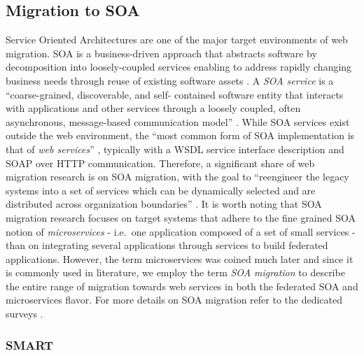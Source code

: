\hypertarget{sec:soa-migration}{%
\subsection{Migration to SOA}\label{sec:soa-migration}}

Service Oriented Architectures are one of the major target environments of web migration.
SOA is a business-driven approach that abstracts software by decomposition into loosely-coupled services enabling to address rapidly changing business needs through reuse of existing software assets \autocite{Gold2004SOA}.
A \emph{SOA service} is a ``coarse-grained, discoverable, and self- contained software entity that interacts with applications and other services through a loosely coupled, often asynchronous, message-based communication model'' \autocite{Lewis2005SMART}.
While SOA services exist outside the web environment, the ``most common form of SOA implementation is that of \emph{web services}'' \autocite{Lewis2008SMART}, typically with a WSDL service interface description and SOAP over HTTP communication.
Therefore, a significant share of web migration research is on SOA migration, with the goal to ``reengineer the legacy systems into a set of services which can be dynamically selected and are distributed across organization boundaries'' \autocite{Razavian2014a}.
It is worth noting that SOA migration research focuses on target systems that adhere to the fine grained SOA notion of \emph{microservices} - i.e.~one application composed of a set of small services - than on integrating several applications through services to build federated applications.
However, the term microservices was coined much later and since it is commonly used in literature, we employ the term \emph{SOA migration} to describe the entire range of migration towards web services in both the federated SOA and microservices flavor.
For more details on SOA migration refer to the dedicated surveys \autocite{Khadka2013SurveySOAMigration,Razavian2011SOASurvey,Almonaies2010SOAStrategies}.

\hypertarget{smart}{%
\subsubsection{SMART}\label{smart}}

